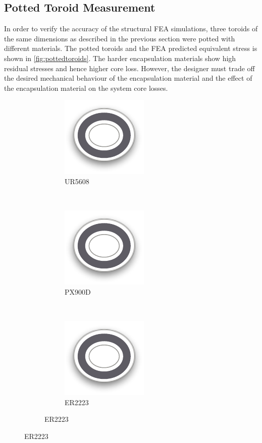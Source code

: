 \documentclass[conference]{IEEEtran}
\begin{document}
\subsection{Potted Toroid Measurement}

In order to verify the accuracy of the structural FEA simulations, three toroids of the same dimensions as described in the previous section were potted with different materials.
The potted toroids and the FEA predicted equivalent stress is shown in \cref{fig:pottedtoroids}.
The harder encapsulation materials show high residual stresses and hence higher core loss. 
However, the designer must trade off the desired mechanical behaviour of the encapsulation material and the effect of the encapsulation material on the system core losses. 

\begin{figure}
  \centering
  \begin{subfigure}{\textwidth}
    \begin{subfigure}{0.3\textwidth}
      \centering
      \includegraphics{figures/toroid.pdf}
      \caption{UR5608}
    \end{subfigure}~
    \begin{subfigure}{0.3\textwidth}
      \centering
      \includegraphics{figures/toroid.pdf}
      \caption{PX900D}
    \end{subfigure}~
    \begin{subfigure}{0.3\textwidth}
      \centering
      \includegraphics{figures/toroid.pdf}
      \caption{ER2223}
    \end{subfigure}


\end{subfigure}
\end{figure}
\end{document}
